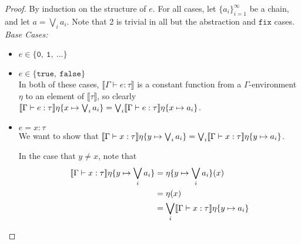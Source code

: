 \begin{proof}
By induction on the structure of $e$. For all cases, let $\{ a_i \}^{\infty}_{i=1}$ be a chain, and let $ a = \bigvee_i a_i$. 
Note that 2 is trivial in all but the abstraction and $\texttt{fix}$ cases.\\
 \emph{Base Cases: } 
 \begin{itemize}
 \item $e \in \{ \texttt{0}, \ \texttt{1}, \ \ldots \}$
 \item $e \in \{ \texttt{true}, \ \texttt{false} \}$\\ 
  In both of these cases, $\llbracket \Gamma \vdash e : \tau \rrbracket$ is a constant function from a $\Gamma$-environment
 $\eta$ to an element of $\llbracket \tau \rrbracket$, so clearly $\llbracket{{\Gamma}\vdash{e}:{\tau}}\rrbracket{\eta\{{x}\mapsto{\bigvee_i a_i}\}} =
\bigvee_i\llbracket{{\Gamma}\vdash{e}:{\tau}}\rrbracket{\eta\{{x}\mapsto{a_i}\}}$.

 \item $e = x : \tau$ \\ 
 We want to show that $\llbracket{{\Gamma}\vdash{x}:{\tau}}\rrbracket{\eta\{{y}\mapsto{\bigvee_i a_i}\}} =
\bigvee_i\llbracket{{\Gamma}\vdash{x}:{\tau}}\rrbracket{\eta\{{y}\mapsto{a_i}\}}$.

In the case that $ y \neq x$, note that
\begin{align*}
\llbracket{{\Gamma}\vdash{x}:{\tau}}\rrbracket{\eta\{{y}\mapsto{\bigvee_i a_i}\}} &= \eta\{y\mapsto \bigvee_i a_i\}(x) \\
&= \eta (x) \\
&= \bigvee_i\llbracket{{\Gamma}\vdash{x}:{\tau}}\rrbracket{\eta\{{y}\mapsto{a_i}\}}
\end{align*}


\end{itemize}
\end{proof}
